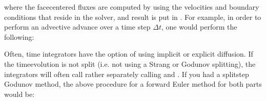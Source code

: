 \documentclass[letterpaper,10pt,english]{sphinxmanual}
\begin{document}
where the face\sphinxhyphen{}centered fluxes are computed by using the velocities and boundary conditions that reside in the solver, and result is put in .
For example, in order to perform an advective advance over a time step \(\Delta t\), one would perform the following:

\begin{sphinxVerbatim}[commandchars=\\\{\},formatcom=\scriptsize]
    

         
    
          
                 
\end{sphinxVerbatim}

Often, time integrators have the option of using implicit or explicit diffusion.
If the time\sphinxhyphen{}evolution is not split (i.e. not using a Strang or Godunov splitting), the integrators will often call  rather separately calling  and .
If you had a split\sphinxhyphen{}step Godunov method, the above procedure for a forward Euler method for both parts would be:
\end{document}
